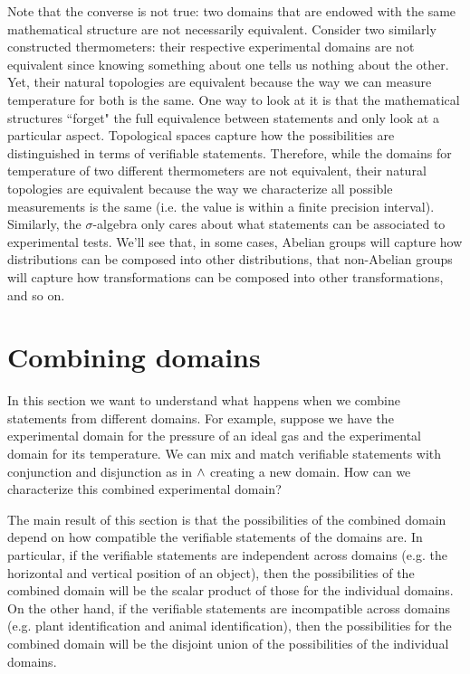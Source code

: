 \documentclass[11pt,letterpaper,fleqn]{memoir} %
\begin{document}
Note that the converse is not true: two domains that are endowed with the same mathematical structure are not necessarily equivalent. Consider two similarly constructed thermometers: their respective experimental domains are not equivalent since knowing something about one tells us nothing about the other. Yet, their natural topologies are equivalent because the way we can measure temperature for both is the same. One way to look at it is that the mathematical structures ``forget" the full equivalence between statements and only look at a particular aspect. Topological spaces capture how the possibilities are distinguished in terms of verifiable statements. Therefore, while the domains for temperature of two different thermometers are not equivalent, their natural topologies are equivalent because the way we characterize all possible measurements is the same (i.e. the value is within a finite precision interval). Similarly, the $\sigma$-algebra only cares about what statements can be associated to experimental tests. We'll see that, in some cases, Abelian groups will capture how distributions can be composed into other distributions, that non-Abelian groups will capture how transformations can be composed into other transformations, and so on.

\section{Combining domains}

In this section we want to understand what happens when we combine statements from different domains. For example, suppose we have the experimental domain for the pressure of an ideal gas and the experimental domain for its temperature. We can mix and match verifiable statements with conjunction and disjunction as in $\wedge$ creating a new domain. How can we characterize this combined experimental domain?

The main result of this section is that the possibilities of the combined domain depend on how compatible the verifiable statements of the domains are. In particular, if the verifiable statements are independent across domains (e.g. the horizontal and vertical position of an object), then the possibilities of the combined domain will be the scalar product of those for the individual domains. On the other hand, if the verifiable statements are incompatible across domains (e.g. plant identification and animal identification), then the possibilities for the combined domain will be the disjoint union of the possibilities of the individual domains.
\end{document}
